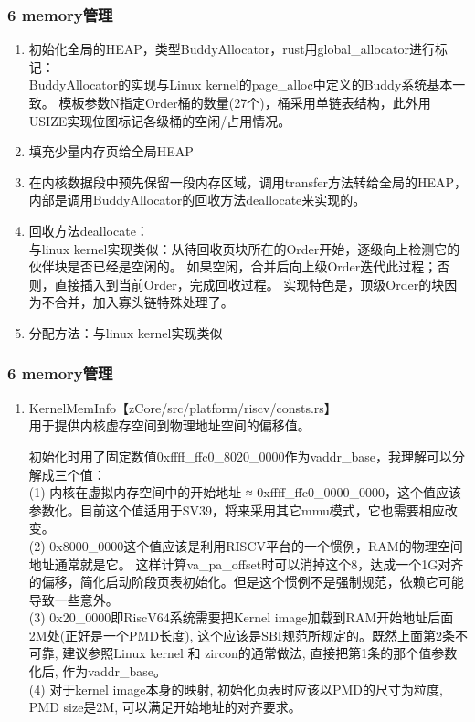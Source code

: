 \documentclass[
8pt, %
]{beamer}
\begin{document}
	\begin{frame}
		\frametitle{6 memory管理}
		\begin{enumerate}
			\item 初始化全局的HEAP，类型BuddyAllocator，rust用global\_allocator进行标记：\\
			BuddyAllocator的实现与Linux kernel的page\_alloc中定义的Buddy系统基本一致。
			模板参数N指定Order桶的数量(27个)，桶采用单链表结构，此外用USIZE实现位图标记各级桶的空闲/占用情况。
			\item 填充少量内存页给全局HEAP
			\item 在内核数据段中预先保留一段内存区域，调用transfer方法转给全局的HEAP，内部是调用BuddyAllocator的回收方法deallocate来实现的。
			\item 回收方法deallocate：\\
			与linux kernel实现类似：从待回收页块所在的Order开始，逐级向上检测它的伙伴块是否已经是空闲的。
			如果空闲，合并后向上级Order迭代此过程；否则，直接插入到当前Order，完成回收过程。
			实现特色是，顶级Order的块因为不合并，加入寡头链特殊处理了。
			\item 分配方法：与linux kernel实现类似
		\end{enumerate}
	\end{frame}

	\begin{frame}
		\frametitle{6 memory管理}
		\begin{enumerate}
			\item KernelMemInfo【zCore/src/platform/riscv/consts.rs】\\
			用于提供内核虚存空间到物理地址空间的偏移值。
			\begin{block}{}
				初始化时用了固定数值0xffff\_ffc0\_8020\_0000作为vaddr\_base，我理解可以分解成三个值：\\
				(1) 内核在虚拟内存空间中的开始地址 ≈ 0xffff\_ffc0\_0000\_0000，这个值应该参数化。目前这个值适用于SV39，将来采用其它mmu模式，它也需要相应改变。\\
				(2) 0x8000\_0000这个值应该是利用RISCV平台的一个惯例，RAM的物理空间地址通常就是它。
				这样计算va\_pa\_offset时可以消掉这个8，达成一个1G对齐的偏移，简化启动阶段页表初始化。但是这个惯例不是强制规范，依赖它可能导致一些意外。\\
				(3) 0x20\_0000即RiscV64系统需要把Kernel image加载到RAM开始地址后面2M处(正好是一个PMD长度),
                这个应该是SBI规范所规定的。既然上面第2条不可靠, 建议参照Linux kernel 和 zircon的通常做法,
                直接把第1条的那个值参数化后, 作为vaddr\_base。\\
				(4) 对于kernel image本身的映射, 初始化页表时应该以PMD的尺寸为粒度,
                PMD size是2M, 可以满足开始地址的对齐要求。
			\end{block}
		\end{enumerate}
	\end{frame}
\end{document}
